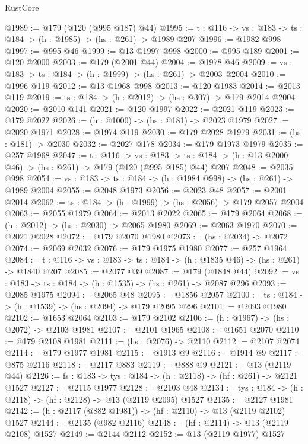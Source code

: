 \begin{lexlean}{RustCore}
\begin{coremodule}
@1989 := @179 (@120 (@995 @187) @44)
@1995 := {t : @116} -> {vs : @183} -> {ts : @184} -> (h : @1985) -> (hs : @261) -> @1989 @207
@1996 := @1982 @998
@1997 := @995 @46
@1999 := @13 @1997 @998
@2000 := @995 @189
@2001 := @120 @2000
@2003 := @179 (@2001 @44)
@2004 := @1978 @46
@2009 := {vs : @183} -> {ts : @184} -> (h : @1999) -> (hs : @261) -> @2003 @2004
@2010 := @1996 @119
@2012 := @13 @1968 @998
@2013 := @120 @1983
@2014 := @2013 @119
@2019 := {ts : @184} -> (h : @2012) -> (hs : @307) -> @179 @2014 @2004
@2020 := @2010 @141
@2021 := @120 @1997
@2022 := @2021 @119
@2023 := @179 @2022
@2026 := (h : @1000) -> (hs : @181) -> @2023 @1979
@2027 := @2020 @1971
@2028 := @1974 @119
@2030 := @179 @2028 @1979
@2031 := (hs : @181) -> @2030
@2032 := @2027 @178
@2034 := @179 @1973 @1979
@2035 := @257 @1968
@2047 := {t : @116} ->
  {vs : @183} ->
  {ts : @184} -> (h : @13 @2000 @46) -> (hs : @261) -> @179 (@120 (@995 @185) @44) @207
@2048 := @2035 @998
@2054 := {vs : @183} -> {ts : @184} -> (h : @1984 @998) -> (hs : @261) -> @1989 @2004
@2055 := @2048 @1973
@2056 := @2023 @48
@2057 := @2001 @2014
@2062 := {ts : @184} -> (h : @1999) -> (hs : @2056) -> @179 @2057 @2004
@2063 := @2055 @1979
@2064 := @2013 @2022
@2065 := @179 @2064
@2068 := (h : @2012) -> (hs : @2030) -> @2065 @1980
@2069 := @2063 @1970
@2070 := @2021 @2028
@2072 := @179 @2070 @1980
@2073 := (hs : @2034) -> @2072
@2074 := @2069 @2032
@2076 := @179 @1975 @1980
@2077 := @257 @1964
@2084 := {t : @116} -> {vs : @183} -> {ts : @184} -> (h : @1835 @46) -> (hs : @261) -> @1840 @207
@2085 := @2077 @39
@2087 := @179 (@1848 @44)
@2092 := {vs : @183} -> {ts : @184} -> (h : @1535) -> (hs : @261) -> @2087 @296
@2093 := @2085 @1975
@2094 := @2065 @48
@2095 := @1856 @2057
@2100 := {ts : @184} -> (h : @1539) -> (hs : @2094) -> @179 @2095 @296
@2101 := @2093 @1980
@2102 := @1653 @2064
@2103 := @179 @2102
@2106 := (h : @1967) -> (hs : @2072) -> @2103 @1981
@2107 := @2101 @1965
@2108 := @1651 @2070
@2110 := @179 @2108 @1981
@2111 := (hs : @2076) -> @2110
@2112 := @2107 @2074
@2114 := @179 @1977 @1981
@2115 := @1913 @9
@2116 := @1914 @9
@2117 := @875 @2116
@2118 := @2117 @883
@2119 := @888 @9
@2121 := @13 (@2119 @44)
@2126 := {fs : @183} -> {tys : @184} -> (h : @2118) -> (hf : @261) -> @2121 @1527
@2127 := @2115 @1977
@2128 := @2103 @48
@2134 := {tys : @184} -> (h : @2118) -> (hf : @2128) -> @13 (@2119 @2095) @1527
@2135 := @2127 @1981
@2142 := (h : @2117 (@882 @1981)) -> (hf : @2110) -> @13 (@2119 @2102) @1527
@2144 := @2135 (@982 @2116)
@2148 := (hf : @2114) -> @13 (@2119 @2108) @1527
@2149 := @2144 @2112
@2152 := @13 (@2119 @1977) @1527

\end{coremodule}
\end{lexlean}
